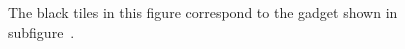 \begin{figure}[H]
{        The black tiles in this figure correspond to the gadget shown in subfigure~.
        \label{fig:next_read_1_op_msr_msd_overview}
    }{}%
    ~
\end{figure}
